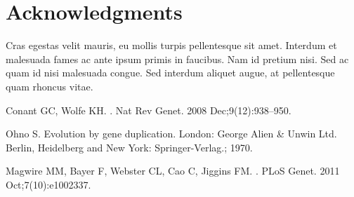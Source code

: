 \documentclass[10pt,letterpaper]{article}
\begin{document}
\section*{Acknowledgments}
Cras egestas velit mauris, eu mollis turpis pellentesque sit amet. Interdum et malesuada fames ac ante ipsum primis in faucibus. Nam id pretium nisi. Sed ac quam id nisi malesuada congue. Sed interdum aliquet augue, at pellentesque quam rhoncus vitae.

\nolinenumbers

%
%
% 
\begin{thebibliography}{10}

Conant GC, Wolfe KH.
.
\newblock Nat Rev Genet. 2008 Dec;9(12):938--950.

Ohno S.
\newblock Evolution by gene duplication.
\newblock London: George Alien \& Unwin Ltd. Berlin, Heidelberg and New York:
  Springer-Verlag.; 1970.

Magwire MM, Bayer F, Webster CL, Cao C, Jiggins FM.
.
\newblock PLoS Genet. 2011 Oct;7(10):e1002337.

\end{thebibliography}
\end{document}
